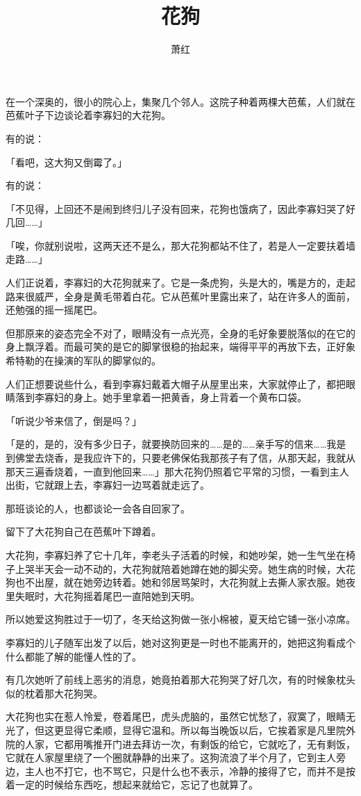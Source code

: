 \documentclass[UTF8]{ctexart}
\title{花狗}
\author{萧红}
\date{}
\begin{document}
\maketitle

\newpage
在一个深奥的，很小的院心上，集聚几个邻人。这院子种着两棵大芭蕉，人们就在芭蕉叶子下边谈论着李寡妇的大花狗。

有的说：

「看吧，这大狗又倒霉了。」

有的说：

「不见得，上回还不是闹到终归儿子没有回来，花狗也饿病了，因此李寡妇哭了好几回……」

「唉，你就别说啦，这两天还不是么，那大花狗都站不住了，若是人一定要扶着墙走路……」

人们正说着，李寡妇的大花狗就来了。它是一条虎狗，头是大的，嘴是方的，走起路来很威严，全身是黄毛带着白花。它从芭蕉叶里露出来了，站在许多人的面前，还勉强的摇一摇尾巴。

但那原来的姿态完全不对了，眼睛没有一点光亮，全身的毛好象要脱落似的在它的身上飘浮着。而最可笑的是它的脚掌很稳的抬起来，端得平平的再放下去，正好象希特勒的在操演的军队的脚掌似的。

人们正想要说些什么，看到李寡妇戴着大帽子从屋里出来，大家就停止了，都把眼睛落到李寡妇的身上。她手里拿着一把黄香，身上背着一个黄布口袋。

「听说少爷来信了，倒是吗？」

「是的，是的，没有多少日子，就要换防回来的……是的……亲手写的信来……我是到佛堂去烧香，是我应许下的，只要老佛保佑我那孩子有了信，从那天起，我就从那天三遍香烧着，一直到他回来……」那大花狗仍照着它平常的习惯，一看到主人出街，它就跟上去，李寡妇一边骂着就走远了。

那班谈论的人，也都谈论一会各自回家了。

留下了大花狗自己在芭蕉叶下蹲着。

大花狗，李寡妇养了它十几年，李老头子活着的时候，和她吵架，她一生气坐在椅子上哭半天会一动不动的，大花狗就陪着她蹲在她的脚尖旁。她生病的时候，大花狗也不出屋，就在她旁边转着。她和邻居骂架时，大花狗就上去撕人家衣服。她夜里失眠时，大花狗摇着尾巴一直陪她到天明。

所以她爱这狗胜过于一切了，冬天给这狗做一张小棉被，夏天给它铺一张小凉席。

李寡妇的儿子随军出发了以后，她对这狗更是一时也不能离开的，她把这狗看成个什么都能了解的能懂人性的了。

有几次她听了前线上恶劣的消息，她竟拍着那大花狗哭了好几次，有的时候象枕头似的枕着那大花狗哭。

大花狗也实在惹人怜爱，卷着尾巴，虎头虎脑的，虽然它忧愁了，寂寞了，眼睛无光了，但这更显得它柔顺，显得它温和。所以每当晚饭以后，它挨着家是凡里院外院的人家，它都用嘴推开门进去拜访一次，有剩饭的给它，它就吃了，无有剩饭，它就在人家屋里绕了一个圈就静静的出来了。这狗流浪了半个月了，它到主人旁边，主人也不打它，也不骂它，只是什么也不表示，冷静的接得了它，而并不是按着一定的时候给东西吃，想起来就给它，忘记了也就算了。
\end{document}
